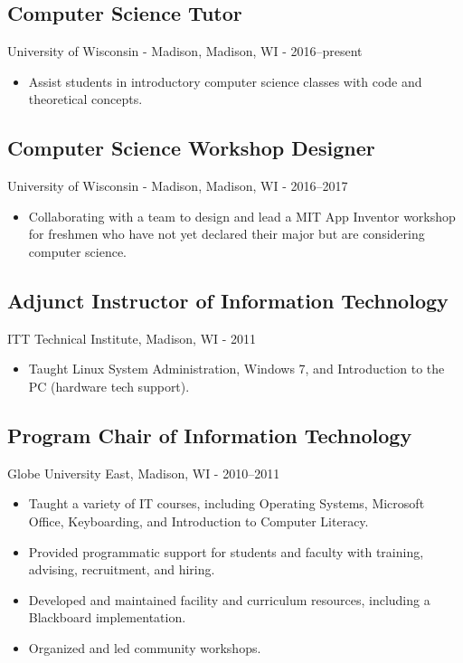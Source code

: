 \documentclass[../main.tex]{subfiles}
\begin{document}
	\subsection*{Computer Science Tutor}
     University of Wisconsin - Madison, Madison, WI - 2016--present
	\begin{itemize}
		\item{Assist students in introductory computer science classes with code and theoretical concepts.}
	\end{itemize}

	\subsection*{Computer Science Workshop Designer}
     University of Wisconsin - Madison, Madison, WI - 2016--2017
	\begin{itemize}
		\item{Collaborating with a team to design and lead a MIT App Inventor workshop for freshmen who have not yet declared their major but are considering computer science.}
	\end{itemize}


	\subsection*{Adjunct Instructor of Information Technology}
     ITT Technical Institute, Madison, WI - 2011
	\begin{itemize}
		\item{Taught Linux System Administration, Windows 7, and Introduction to the PC (hardware tech support).}
	\end{itemize}

	\subsection*{Program Chair of Information Technology}
     Globe University East, Madison, WI - 2010--2011
	\begin{itemize}
		\item{Taught a variety of IT courses, including Operating Systems, Microsoft Office, Keyboarding, and Introduction to Computer Literacy.}
		\item{Provided programmatic support for students and faculty with training, advising, recruitment, and hiring.}
		\item{Developed and maintained facility and curriculum resources, including a Blackboard implementation.}
		\item{Organized and led community workshops.}
	\end{itemize}
\end{document}
